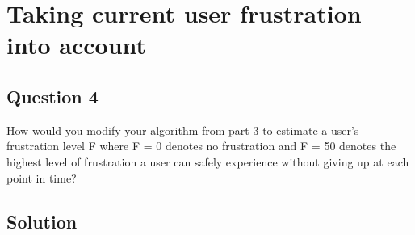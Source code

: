 \chapter{Taking current user frustration into account} \label{ch:q4_user_frustration}

\section{Question 4} \label{sec:q4}
How would you modify your algorithm from part 3 to estimate a
user’s frustration level F where F = 0 denotes no frustration and F = 50
denotes the highest level of frustration a user can safely experience
without giving up at each point in time?

\section{Solution} \label{sec:q3_solution}

\subsection{} \label{subsec:}

